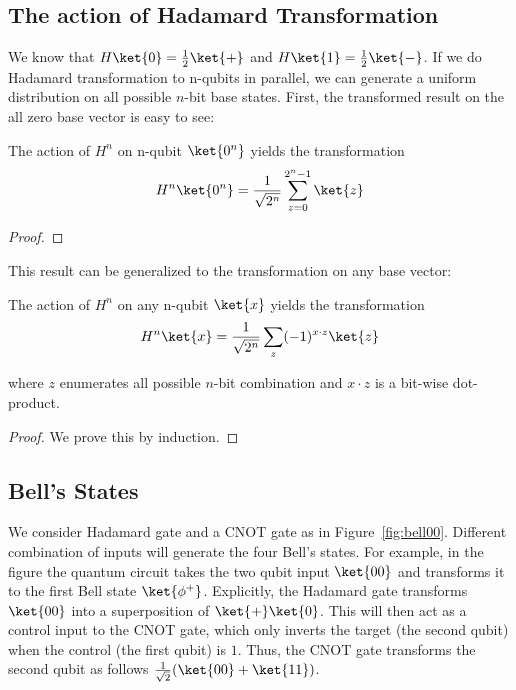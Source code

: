 \subsection{The action of Hadamard Transformation}
We know that \(H\ket{0} = \frac{1}{2}\ket{+}\) and  \(H\ket{1} = \frac{1}{2}\ket{-}\). If we do Hadamard transformation to n-qubits in parallel, we can generate a uniform distribution on all possible \(n\)-bit base states. First, the transformed result on the all zero base vector is easy to see: 
\begin{lemma}
The action of \(H^{n}\) on n-qubit \(\ket{0^n}\) yields the transformation
\begin{align*}
H^{n}\ket{0^n} = \frac{1}{\sqrt{2^n}} \sum_{z=0}^{2^n-1} \ket{z}  
\end{align*}
\end{lemma}
\begin{proof}
\end{proof}


This result can be generalized to the transformation on any base vector: 
\begin{lemma}
The action of \(H^{n}\) on any n-qubit \(\ket{x}\) yields the transformation
\begin{align*}
H^{n}\ket{x} = \frac{1}{\sqrt{2^n}} \sum_{z} (-1)^{x\cdot z} \ket{z}     
\end{align*}

where \(z\) enumerates all possible \(n\)-bit combination and \(x\cdot z\) is a bit-wise dot-product. 
\label{lemma:HadamardAction}    
\end{lemma}

\begin{proof}
    We prove this by induction. 
\end{proof}

\subsection{Bell's States}
 We consider Hadamard gate and a CNOT gate as in Figure~\ref{fig:bell00}. Different combination of inputs will generate the four Bell's states. For example, in the figure the quantum circuit takes the two qubit input \(\ket{00}\) and transforms it to the first Bell state \(\ket{\phi^{+}}\). Explicitly, the Hadamard gate transforms \(\ket{00}\) into a superposition of \(\ket{+}\ket{0}\). This will then act as a control input to the CNOT gate, which only inverts the target (the second qubit) when the control (the first qubit) is \(1\). Thus, the CNOT gate transforms the second qubit as follows 
\(\frac {1}{\sqrt{2}}(\ket{00} + \ket{11})\).

